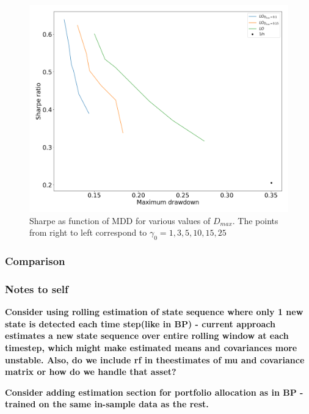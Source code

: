 \begin{figure}[H]
    \centering
    \includegraphics[width=1\textwidth]{analysis/portfolio_exercise/images/mle/sharpe_mdd_lo.png}
    \caption[Sharpe as function of MDD for various values of $D_{max}$]{Sharpe as function of MDD for various values of $D_{max}$. The points from right to left correspond to $\gamma_0=1,3,5,10,15,25$}
    \label{fig:MPC_sharpe_mdd_ls}
\end{figure}

\subsubsection{Comparison}



\subsubsection{Notes to self}


\textbf{Consider using rolling estimation of state sequence where only 1 new state is detected each time step(like in BP) - current approach estimates a new state sequence over entire rolling window at each timestep, which might make estimated means and covariances more unstable. Also, do we include rf in theestimates of mu and covariance matrix or how do we handle that asset?}

\textbf{Consider adding estimation section for portfolio allocation as in BP - trained on the same in-sample data as the rest.}